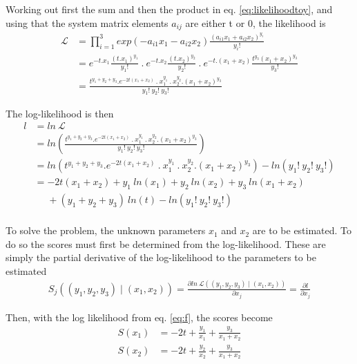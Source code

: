 \documentclass[report,12pt]{report}
\begin{document}
Working out first the sum and then the product in eq. \ref{eq:likelihoodtoy}, and using that the system matrix elements $a_{ij}$ are either t or 0, the likelihood is
\begin{align}
	\mathcal{L} 
	&= 
	\prod_{i=1}^{3} exp(-a_{i1}x_1 - a_{i2}x_2) 
	\frac{(a_{i1}x_1 + a_{i2}x_2)^{y_i}}{y_i!}
	\nonumber\\
	&= e^{-t.x_1} \frac{(t.x_1)^{y_1}}{y_1!}\ .\  
	e^{-t.x_2} \frac{(t.x_2)^{y_2}}{y_2!}\ .\
	e^{-t.(x_1 + x_2)} \frac{t^{y_3}(x_1 + x_2)^{y_3}}{y_3!}
	\nonumber\\
	&= \frac{t^{y_1 + y_2 + y_3} . 
	e^{-2t(x_1+x_2)}\ .\ x_1^{y_1}\ .\ x_2^{y_2}.(x_1+x_2)^{y_3}}
	{y_1!\ y_2!\ y_3!}
\end{align}

The log-likelihood is then
\begin{align}
	l &= ln\ \mathcal{L}
	\nonumber\\
	&= ln\left( \frac{t^{y_1 + y_2 + y_3} . 
	e^{-2t(x_1+x_2)}\ .\ x_1^{y_1}\ .\ x_2^{y_2}.(x_1+x_2)^{y_3}}
	{y_1!\ y_2!\ y_3!} \right)
	\nonumber\\
	&= ln\left( 
	t^{y_1 + y_2 + y_3} . 
	e^{-2t(x_1+x_2)}\ .\ x_1^{y_1}\ .\ x_2^{y_2}.(x_1+x_2)^{y_3} 
	\right) - 
	ln\left( y_1!\ y_2!\ y_3! \right)
	\nonumber\\
	&= - 2t(x_1+x_2) + y_1\ ln(x_1) + y_2\ ln(x_2) + y_3\ ln(x_1+x_2) 
	\nonumber\\
	&\phantom{= }+ (y_1 + y_2 + y_3)\ ln(t) - ln\left( y_1!\ y_2!\ y_3! \right)
	\nonumber\\
	\label{eq:f}
\end{align}

To solve the problem, the unknown parameters $x_1$ and $x_2$ are to be estimated. To do so the scores must first be determined from the log-likelihood. These are simply the partial derivative of the log-likelihood to the parameters to be estimated
\begin{align}
	S_j((y_1, y_2, y_3) \mid (x_1, x_2)) 
	= \frac{\partial ln\ \mathcal{L} 
	\left( (y_1, y_2, y_3) \mid (x_1, x_2) \right)}{\partial x_j}
	= \frac{\partial l}{\partial x_j}
\end{align}

Then, with the log likelihood from eq. \ref{eq:f}, the scores become
\begin{align}
	S(x_1) &= -2t + \frac{y_1}{x_1} + \frac{y_3}{x_1 + x_2}
	\nonumber\\
	S(x_2) &= -2t + \frac{y_2}{x_2} + \frac{y_3}{x_1+x_2}
	\label{eq:scoremltoy}
\end{align}
\end{document}
